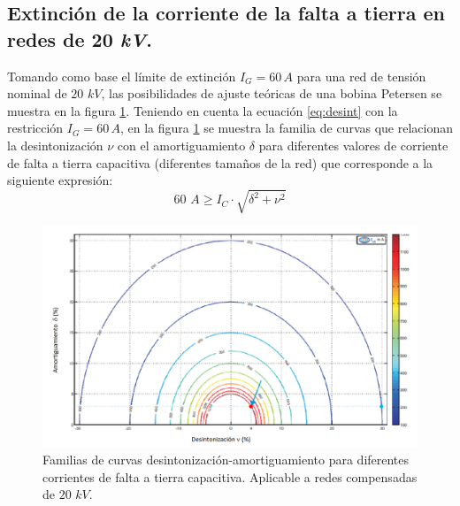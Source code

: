         \subsection{Extinción de la corriente de la falta a tierra en redes de 20 \textit{kV}.}
            Tomando como base el límite de extinción $I_\textit{G} = 60\,\textit{A}$ para una red de tensión nominal de $20\textit{ kV}$, las posibilidades de ajuste teóricas de una bobina Petersen se muestra en la figura \ref{fig:amortVSDesint1}. Teniendo en cuenta la ecuación \eqref{eq:desint} con la restricción $I_\textit{G} = 60\,\textit{A}$, en la figura \ref{fig:amortVSDesint1} se muestra la familia de curvas que relacionan la desintonización $\nu$ con el amortiguamiento $\delta$ para diferentes valores de corriente de falta a tierra capacitiva (diferentes tamaños de la red) que corresponde a la siguiente expresión:
            \begin{equation}
                60\textit{ A} \geq I_\textit{C}\cdot \sqrt{\delta^2+\nu^2}
            \end{equation}

            \begin{figure}[H]
                \centering
                \includegraphics[scale=0.3]{capitulos/amortVSDesint1.png}
                \caption{Familias de curvas desintonización-amortiguamiento para diferentes corrientes de falta a tierra capacitiva. Aplicable a redes compensadas de $20\textit{ kV}$.}
                \label{fig:amortVSDesint1}
            \end{figure}

